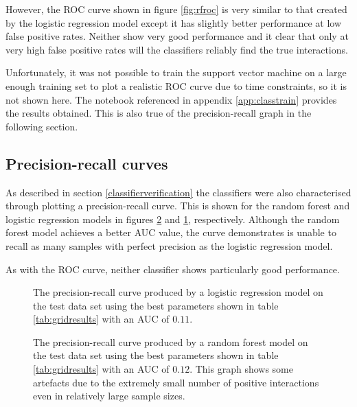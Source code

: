 However, the \ac{ROC} curve shown in figure \ref{fig:rfroc} is very similar to that created by the logistic regression model except it has slightly better performance at low false positive rates.
Neither show very good performance and it clear that only at very high false positive rates will the classifiers reliably find the true interactions.


Unfortunately, it was not possible to train the support vector machine on a large enough training set to plot a realistic \ac{ROC} curve due to time constraints, so it is not shown here.
The notebook referenced in appendix \ref{app:classtrain} provides the results obtained.
This is also true of the precision-recall graph in the following section.


\subsection{Precision-recall curves}

As described in section \ref{classifierverification} the classifiers were also characterised through plotting a precision-recall curve.
This is shown for the random forest and logistic regression models in figures \ref{fig:rfpr} and \ref{fig:logpr}, respectively.
Although the random forest model achieves a better \ac{AUC} value, the curve demonstrates is unable to recall as many samples with perfect precision as the logistic regression model.

As with the \ac{ROC} curve, neither classifier shows particularly good performance.

\begin{figure}
    \centering
    \setlength\figureheight{2in}
    \setlength\figurewidth{3in}
    \caption{The precision-recall curve produced by a logistic regression model on the test data set using the best parameters shown in table \ref{tab:gridresults} with an \ac{AUC} of $0.11$.}
    \label{fig:logpr}
\end{figure}

\begin{figure}
    \centering
    \setlength\figureheight{2in}
    \setlength\figurewidth{3in}
    \caption{The precision-recall curve produced by a random forest model on the test data set using the best parameters shown in table \ref{tab:gridresults} with an \ac{AUC} of $0.12$. This graph shows some artefacts due to the extremely small number of positive interactions even in relatively large sample sizes.}
    \label{fig:rfpr}
\end{figure}


